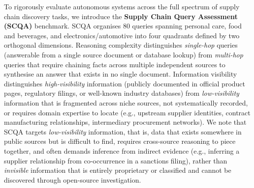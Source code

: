\documentclass{article}
\begin{document}
To rigorously evaluate autonomous systems across the full spectrum of supply chain discovery tasks, we introduce the \textbf{Supply Chain Query Assessment (SCQA)} benchmark. SCQA organises 80 queries spanning personal care, food and beverages, and electronics/automotive into four quadrants defined by two orthogonal dimensions.
Reasoning complexity distinguishes \textit{single-hop} queries (answerable from a single source document or database lookup) from \textit{multi-hop} queries that require chaining facts across multiple independent sources to synthesise an answer that exists in no single document. Information visibility distinguishes \textit{high-visibility} information (publicly documented in official product pages, regulatory filings, or well-known industry databases) from \textit{low-visibility} information that is fragmented across niche sources, not systematically recorded, or requires domain expertise to locate (e.g., upstream supplier identities, contract manufacturing relationships, intermediary procurement networks). We note that SCQA targets \textit{low-visibility} information, that is, data that exists somewhere in public sources but is difficult to find, requires cross-source reasoning to piece together, and often demands inference from indirect evidence (e.g., inferring a supplier relationship from co-occurrence in a sanctions filing), rather than \textit{invisible} information that is entirely proprietary or classified and cannot be discovered through open-source investigation.
\end{document}
